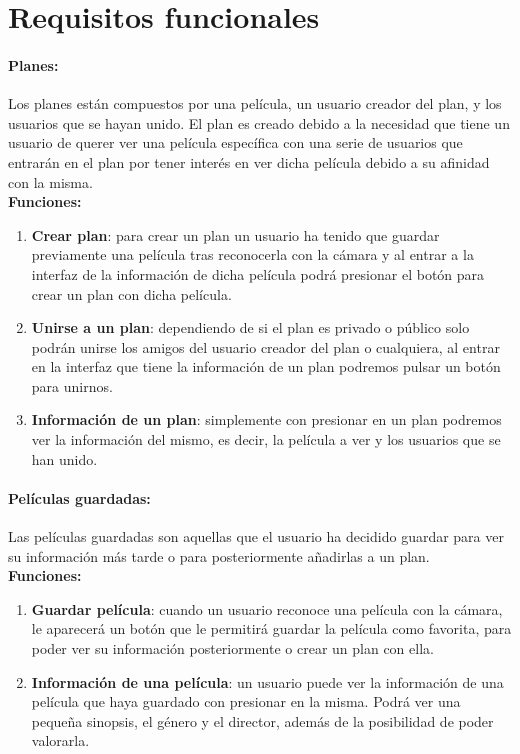 \section{Requisitos funcionales}
\label{makereference3.3}

\paragraph{\large Planes:\\}

Los planes están compuestos por una película, un usuario creador del plan, y los usuarios que se hayan unido. El plan
es creado debido a la necesidad que tiene un usuario de querer ver una película específica con una serie de usuarios que 
entrarán en el plan por tener interés en ver dicha película debido a su afinidad con la misma.
\\
\textbf{Funciones:}
\begin{enumerate}
    \item \textbf{Crear plan}: para crear un plan un usuario ha tenido que guardar previamente una película tras reconocerla con la cámara y al entrar a la interfaz de la información de dicha película podrá presionar el botón para crear un plan con dicha película.
    \item \textbf{Unirse a un plan}: dependiendo de si el plan es privado o público solo podrán unirse los amigos del usuario creador del plan o cualquiera, al entrar en la interfaz que tiene la información de un plan podremos pulsar un botón para unirnos.
    \item \textbf{Información de un plan}: simplemente con presionar en un plan podremos ver la información del mismo, es decir, la película a ver y los usuarios que se han unido.
\end{enumerate}
\newpage
\paragraph{\large Películas guardadas:\\}

Las películas guardadas son aquellas que el usuario ha decidido guardar para ver su información más tarde o para posteriormente añadirlas a un plan.
\\
\textbf{Funciones:}
\begin{enumerate}
    \item \textbf{Guardar película}: cuando un usuario reconoce una película con la cámara, le aparecerá un botón que le permitirá guardar la película como favorita, para poder ver su información posteriormente o crear un plan con ella.
    \item \textbf{Información de una película}: un usuario puede ver la información de una película que haya guardado con presionar en la misma. Podrá ver una pequeña sinopsis, el género y el director, además de la posibilidad de poder valorarla.
\end{enumerate} 

